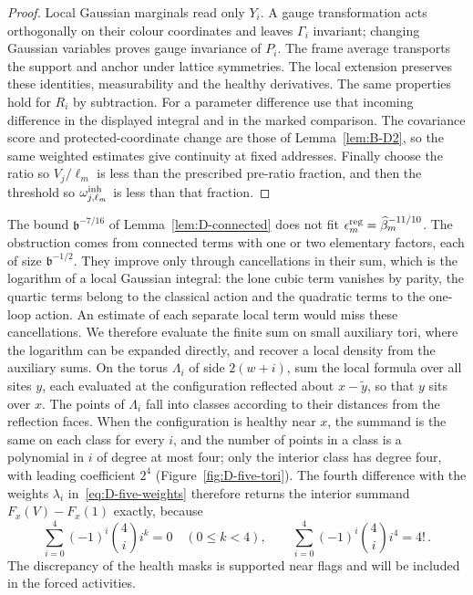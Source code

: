 \begin{proof}
Local Gaussian marginals read only $Y_i$. A gauge transformation acts orthogonally on their colour coordinates and leaves $\Gamma_i$ invariant; changing Gaussian variables proves gauge invariance of $P_i$. The frame average transports the support and anchor under lattice symmetries. The local extension preserves these identities, measurability and the healthy derivatives. The same properties hold for $R_i$ by subtraction. For a parameter difference use that incoming difference in the displayed integral and in the marked comparison. The covariance score and protected-coordinate change are those of Lemma~\ref{lem:B-D2}, so the same weighted estimates give continuity at fixed addresses. Finally choose the ratio so $V_j/\ell_m$ is less than the prescribed pre-ratio fraction, and then the threshold so $\omega_{j,\ell_m}^{\rm inh}$ is less than that fraction.
\end{proof}

The bound $\mathfrak b^{-7/16}$ of Lemma~\ref{lem:D-connected} does not fit $\epsilon_m^{\rm reg}=\widehat{\beta}_m^{-11/10}$. The obstruction comes from connected terms with one or two elementary factors, each of size $\mathfrak b^{-1/2}$. They improve only through cancellations in their sum, which is the logarithm of a local Gaussian integral: the lone cubic term vanishes by parity, the quartic terms belong to the classical action and the quadratic terms to the one-loop action. An estimate of each separate local term would miss these cancellations. We therefore evaluate the finite sum on small auxiliary tori, where the logarithm can be expanded directly, and recover a local density from the auxiliary sums. On the torus $\Lambda_i$ of side $2(w+i)$, sum the local formula over all sites $y$, each evaluated at the configuration reflected about $x-\widetilde y$, so that $y$ sits over $x$. The points of $\Lambda_i$ fall into classes according to their distances from the reflection faces. When the configuration is healthy near $x$, the summand is the same on each class for every $i$, and the number of points in a class is a polynomial in $i$ of degree at most four; only the interior class has degree four, with leading coefficient $2^4$ (Figure~\ref{fig:D-five-tori}). The fourth difference with the weights $\lambda_i$ in~\eqref{eq:D-five-weights} therefore returns the interior summand $F_x(V)-F_x(1)$ exactly, because
\begin{equation*}
\sum_{i=0}^4(-1)^i\binom4i i^k=0\quad(0\le k<4),\qquad
\sum_{i=0}^4(-1)^i\binom4i i^4=4!\,.
\end{equation*}
The discrepancy of the health masks is supported near flags and will be included in the forced activities.

